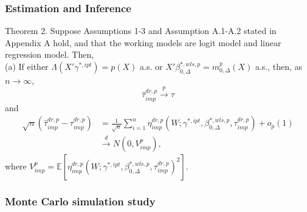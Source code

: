 \documentclass{beamer}
\begin{document}
\begin{frame}\frametitle{Estimation and Inference}
    \begin{block}{Theorem 2.}
        Suppose Assumptions 1-3 and Assumption A.1-A.2 stated in Appendix A hold, and that the working models are logit model and linear regression model. Then,
        \\(a) If either $\Lambda(X'\gamma^{\ast,ipt}) = p(X)$ a.s. or $X'\beta^{\ast, wls, p}_{0,\Delta} = m^{p}_{0,\Delta}(X)$ a.s., then, as $n \rightarrow \infty$,
        $$
            \widehat{\tau}^{dr,p}_{imp} \overset{p}{\to} \tau
        $$
        and
        \begin{align*}
            \sqrt{n}(\widehat{\tau}^{dr,p}_{imp} - \tau^{dr,p}_{imp})
            &= 
            \frac{1}{\sqrt{n}}\sum_{i = 1}^{n} \eta^{dr,p}_{imp}(W;\gamma^{\ast,ipt}, \beta^{\ast,wls,p}_{0,\Delta},\tau^{dr,p}_{imp}) + o_{p}(1)
            \\ & \overset{d}{\to} N(0,V^{p}_{imp}),
        \end{align*}
        where $V^{p}_{imp} = \mathbb{E}\left[\eta^{dr,p}_{imp}(W;\gamma^{\ast, ipt},\beta^{\ast, wls, p}_{0, \Delta}, \tau^{dr, p}_{imp})^{2}\right]$.
    \end{block}
\end{frame}


\begin{frame}\frametitle{Monte Carlo simulation study}

\end{frame}


\end{document}
